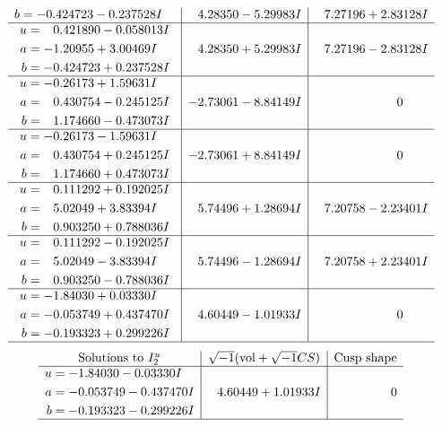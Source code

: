 \documentclass[1p]{elsarticle_modified}
\theoremstyle{definition}
\newcommand{\I}{\sqrt{-1}}
\begin{document}
$$\begin{array}{c|c|c}
\begin{aligned}
b &= -0.424723 - 0.237528 I\end{aligned}
 & \phantom{-}4.28350 - 5.29983 I & \phantom{-}7.27196 + 2.83128 I \\ \hline\begin{aligned}
u &= \phantom{-}0.421890 - 0.058013 I \\
a &= -1.20955 + 3.00469 I \\
b &= -0.424723 + 0.237528 I\end{aligned}
 & \phantom{-}4.28350 + 5.29983 I & \phantom{-}7.27196 - 2.83128 I \\ \hline\begin{aligned}
u &= -0.26173 + 1.59631 I \\
a &= \phantom{-}0.430754 - 0.245125 I \\
b &= \phantom{-}1.174660 - 0.473073 I\end{aligned}
 & -2.73061 - 8.84149 I & \phantom{-0.000000 } 0 \\ \hline\begin{aligned}
u &= -0.26173 - 1.59631 I \\
a &= \phantom{-}0.430754 + 0.245125 I \\
b &= \phantom{-}1.174660 + 0.473073 I\end{aligned}
 & -2.73061 + 8.84149 I & \phantom{-0.000000 } 0 \\ \hline\begin{aligned}
u &= \phantom{-}0.111292 + 0.192025 I \\
a &= \phantom{-}5.02049 + 3.83394 I \\
b &= \phantom{-}0.903250 + 0.788036 I\end{aligned}
 & \phantom{-}5.74496 + 1.28694 I & \phantom{-}7.20758 - 2.23401 I \\ \hline\begin{aligned}
u &= \phantom{-}0.111292 - 0.192025 I \\
a &= \phantom{-}5.02049 - 3.83394 I \\
b &= \phantom{-}0.903250 - 0.788036 I\end{aligned}
 & \phantom{-}5.74496 - 1.28694 I & \phantom{-}7.20758 + 2.23401 I \\ \hline\begin{aligned}
u &= -1.84030 + 0.03330 I \\
a &= -0.053749 + 0.437470 I \\
b &= -0.193323 + 0.299226 I\end{aligned}
 & \phantom{-}4.60449 - 1.01933 I & \phantom{-0.000000 } 0\\
 \hline 
 \end{array}$$\newpage$$\begin{array}{c|c|c}  
\text{Solutions to }I^u_{2}& \I (\text{vol} + \sqrt{-1}CS) & \text{Cusp shape}\\
 \hline 
\begin{aligned}
u &= -1.84030 - 0.03330 I \\
a &= -0.053749 - 0.437470 I \\
b &= -0.193323 - 0.299226 I\end{aligned}
 & \phantom{-}4.60449 + 1.01933 I & \phantom{-0.000000 } 0\\
 \hline 
 \end{array}$$\newpage
\end{document}
